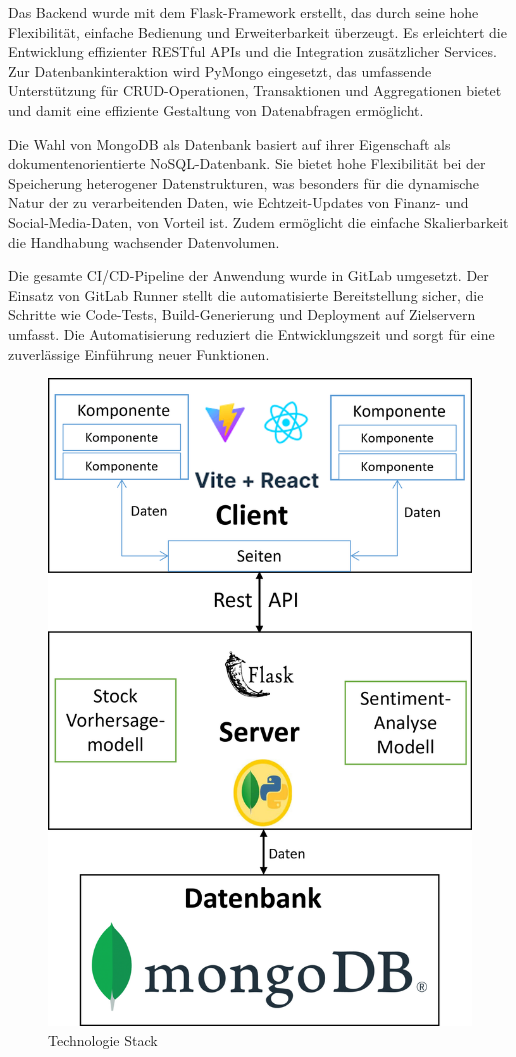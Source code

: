 \documentclass[conference,a4paper,flushend]{cs-techrep}
\begin{document}
Das Backend wurde mit dem Flask-Framework erstellt, das durch seine hohe Flexibilität, einfache Bedienung und Erweiterbarkeit überzeugt. Es erleichtert die Entwicklung effizienter RESTful APIs und die Integration zusätzlicher Services. Zur Datenbankinteraktion wird PyMongo eingesetzt, das umfassende Unterstützung für CRUD-Operationen, Transaktionen und Aggregationen bietet und damit eine effiziente Gestaltung von Datenabfragen ermöglicht.

Die Wahl von MongoDB als Datenbank basiert auf ihrer Eigenschaft als dokumentenorientierte NoSQL-Datenbank. Sie bietet hohe Flexibilität bei der Speicherung heterogener Datenstrukturen, was besonders für die dynamische Natur der zu verarbeitenden Daten, wie Echtzeit-Updates von Finanz- und Social-Media-Daten, von Vorteil ist. Zudem ermöglicht die einfache Skalierbarkeit die Handhabung wachsender Datenvolumen.

Die gesamte CI/CD-Pipeline der Anwendung wurde in GitLab umgesetzt. Der Einsatz von GitLab Runner stellt die automatisierte Bereitstellung sicher, die Schritte wie Code-Tests, Build-Generierung und Deployment auf Zielservern umfasst. Die Automatisierung reduziert die Entwicklungszeit und sorgt für eine zuverlässige Einführung neuer Funktionen.

\begin{figure}
    \centering
    \includegraphics[width=0.9\linewidth]{TechStack.png}
    \caption{Technologie Stack}
\end{figure}
\end{document}
